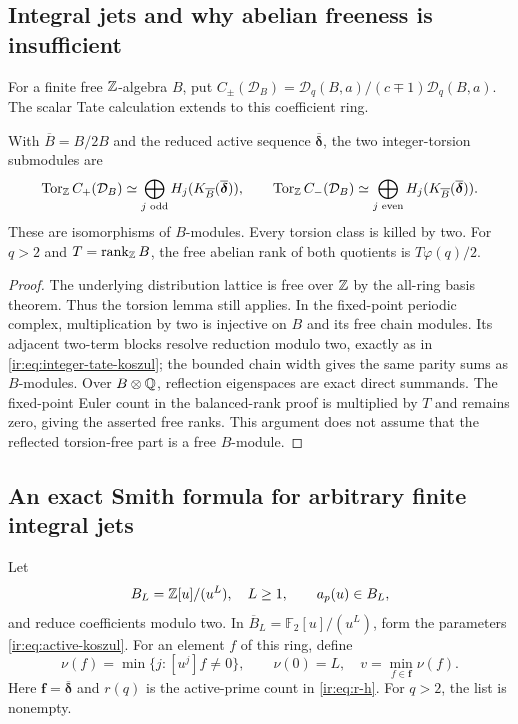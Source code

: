 \subsection{Integral jets and why abelian freeness is insufficient}
For a finite free $\mathbb{Z}$-algebra $B$, put
$C_\pm(\mathcal D_B)=\mathcal D_q(B,a)/(c\mp1)\mathcal D_q(B,a)$.
The scalar Tate calculation extends to this coefficient ring.
\begin{proposition}\label{irjet:thm:finite-free-koszul}
With $\overline B=B/2B$ and the reduced active sequence
$\overline{\boldsymbol\delta}$, the two integer-torsion submodules are
\[
 \operatorname{Tor}_{\mathbb{Z}}C_+(\mathcal D_B)
 \simeq\bigoplus_{j\text{ odd}} H_j(K_{\overline B}(\overline{\boldsymbol\delta})),
 \qquad
 \operatorname{Tor}_{\mathbb{Z}}C_-(\mathcal D_B)
 \simeq\bigoplus_{j\text{ even}} H_j(K_{\overline B}(\overline{\boldsymbol\delta})).
\]
These are isomorphisms of $B$-modules. Every torsion class is killed by two.
For $q>2$ and $T=\operatorname{rank}_{\mathbb{Z}}B$, the free abelian rank of
both quotients is $T\varphi(q)/2$.
\end{proposition}
\begin{proof}
The underlying distribution lattice is free over $\mathbb{Z}$ by the all-ring
basis theorem. Thus the torsion lemma still applies. In the fixed-point
periodic complex, multiplication by two is injective on $B$ and its
free chain modules. Its adjacent two-term blocks resolve reduction modulo
two, exactly as in \eqref{ir:eq:integer-tate-koszul}; the bounded chain
width gives the same parity sums as $B$-modules. Over $B\otimes\mathbb{Q}$,
reflection eigenspaces are exact direct summands. The fixed-point Euler
count in the balanced-rank proof is multiplied by $T$ and remains zero,
giving the asserted free ranks. This argument does not assume that the
reflected torsion-free part is a free $B$-module.
\end{proof}

\subsection{An exact Smith formula for arbitrary finite integral jets}
\label{irjet:sec:jets}
Let
\[
 B_L=\mathbb{Z}[u]/(u^L),\quad L\ge1,\qquad
 a_p(u)\in B_L,
\]
and reduce coefficients modulo two. In
$\overline B_L=\mathbb F_2[u]/(u^L)$, form the parameters
\eqref{ir:eq:active-koszul}. For an element $f$ of this ring, define
\[
 \nu(f)=\min\{j:[u^j]f\ne0\},\qquad \nu(0)=L,
 \quad v=\min_{f\in\boldsymbol f}\nu(f).
\]
Here $\boldsymbol f=\overline{\boldsymbol\delta}$ and $r(q)$ is the active-prime count in \eqref{ir:eq:r-h}. For $q>2$, the list is nonempty.

